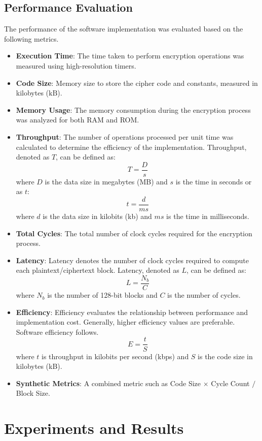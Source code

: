 \documentclass[conference]{IEEEtran}
\begin{document}
\subsection{Performance Evaluation}

The performance of the software implementation was evaluated based on the following metrics.

\begin{itemize}
  \item \textbf{Execution Time}: The time taken to perform encryption operations was measured using high-resolution timers.
  \item \textbf{Code Size}: Memory size to store the cipher code and constants, measured in kilobytes ($\text{kB}$).
  \item \textbf{Memory Usage}: The memory consumption during the encryption process was analyzed for both RAM and ROM.
  \item \textbf{Throughput}: The number of operations processed per unit time was calculated to determine the efficiency of the implementation. Throughput, denoted as \( T \), can be defined as:
  \[ T = \frac{D}{s} \]
  where \( D \) is the data size in megabytes (MB) and \( s \) is the time in seconds or as \( t \):
  \[ t = \frac{d}{ms} \]
  where \( d \) is the data size in kilobits (kb) and \( ms \) is the time in milliseconds.
  \item \textbf{Total Cycles}: The total number of clock cycles required for the encryption process.
  \item \textbf{Latency}: Latency denotes the number of clock cycles required to compute each plaintext/ciphertext block. Latency, denoted as \( L \), can be defined as:
  \[ L = \frac{N_b}{C} \]
  where \( N_b \) is the number of 128-bit blocks and \( C \) is the number of cycles.
  \item \textbf{Efficiency}: Efficiency evaluates the relationship between performance and implementation cost. Generally, higher efficiency values are preferable. Software efficiency follows.
  \[ E = \frac{t}{S} \]
  where \( t \) is throughput in kilobits per second (kbps) and \( S \) is the code size in kilobytes (kB).
  \item \textbf{Synthetic Metrics}: A combined metric such as Code Size $\times$ Cycle Count $/$ Block Size.
\end{itemize}


\section{Experiments and Results}\label{sec:exp}
\end{document}
